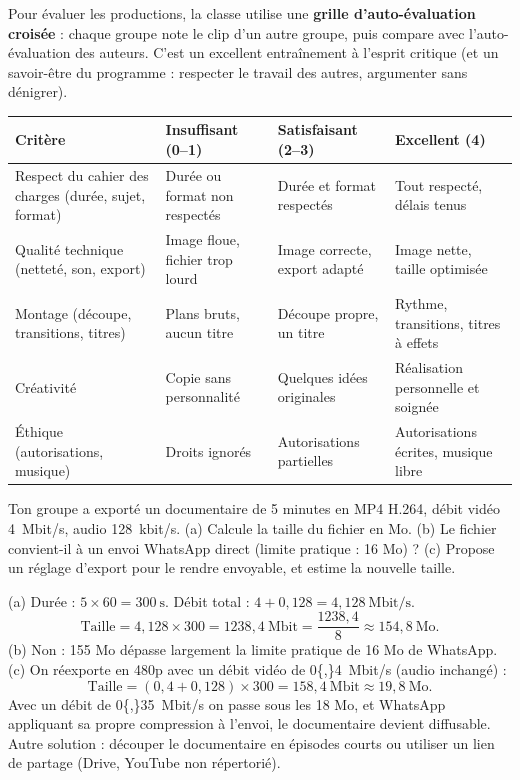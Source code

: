 \documentclass[11pt]{article}
\begin{document}
Pour évaluer les productions, la classe utilise une \textbf{grille d'auto-évaluation croisée} : chaque groupe note le clip d'un autre groupe, puis compare avec l'auto-évaluation des auteurs. C'est un excellent entraînement à l'esprit critique (et un savoir-être du programme : respecter le travail des autres, argumenter sans dénigrer).

\begin{center}
\begin{tabularx}{\linewidth}{|X|l|l|l|}
\hline
\rowcolor{popblueL} \textbf{Critère} & \textbf{Insuffisant (0--1)} & \textbf{Satisfaisant (2--3)} & \textbf{Excellent (4)} \\
\hline
Respect du cahier des charges (durée, sujet, format) & Durée ou format non respectés & Durée et format respectés & Tout respecté, délais tenus \\
\hline
Qualité technique (netteté, son, export) & Image floue, fichier trop lourd & Image correcte, export adapté & Image nette, taille optimisée \\
\hline
Montage (découpe, transitions, titres) & Plans bruts, aucun titre & Découpe propre, un titre & Rythme, transitions, titres à effets \\
\hline
Créativité & Copie sans personnalité & Quelques idées originales & Réalisation personnelle et soignée \\
\hline
Éthique (autorisations, musique) & Droits ignorés & Autorisations partielles & Autorisations écrites, musique libre \\
\hline
\end{tabularx}
\end{center}

\begin{exercice}
Ton groupe a exporté un documentaire de 5 minutes en MP4 H.264, débit vidéo \SI{4}{Mbit/s}, audio \SI{128}{kbit/s}. (a) Calcule la taille du fichier en Mo. (b) Le fichier convient-il à un envoi WhatsApp direct (limite pratique : 16 Mo) ? (c) Propose un réglage d'export pour le rendre envoyable, et estime la nouvelle taille.
\end{exercice}

\begin{corrige}[Exercice 1]
(a) Durée : $5 \times 60 = 300\ \text{s}$. Débit total : $4 + 0{,}128 = 4{,}128\ \text{Mbit/s}$.
\[ \text{Taille} = 4{,}128 \times 300 = 1238{,}4\ \text{Mbit} = \frac{1238{,}4}{8} \approx 154{,}8\ \text{Mo}. \]
(b) Non : 155 Mo dépasse largement la limite pratique de 16 Mo de WhatsApp.
(c) On réexporte en 480p avec un débit vidéo de \SI{0{,}4}{Mbit/s} (audio inchangé) :
\[ \text{Taille} = (0{,}4 + 0{,}128) \times 300 = 158{,}4\ \text{Mbit} \approx 19{,}8\ \text{Mo}. \]
Avec un débit de \SI{0{,}35}{Mbit/s} on passe sous les 18 Mo, et WhatsApp appliquant sa propre compression à l'envoi, le documentaire devient diffusable. Autre solution : découper le documentaire en épisodes courts ou utiliser un lien de partage (Drive, YouTube non répertorié).
\end{corrige}
\end{document}
